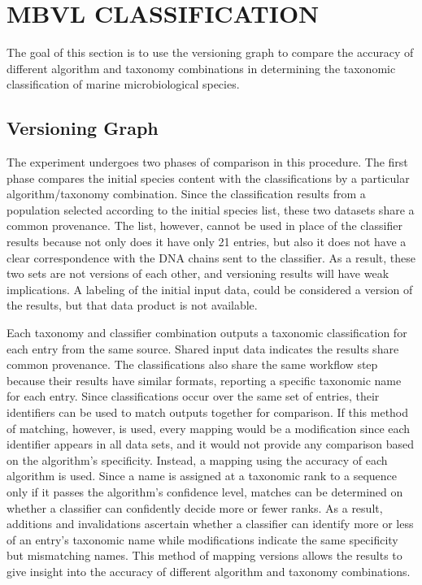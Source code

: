 
\chapter{MBVL CLASSIFICATION}\label{ch:mbvl`}

The goal of this section is to use the versioning graph to compare the accuracy of different algorithm and taxonomy combinations in determining the taxonomic classification of marine microbiological species.

\section{Versioning Graph}

The experiment undergoes two phases of comparison in this procedure.
The first phase compares the initial species content with the classifications by a particular algorithm/taxonomy combination.
Since the classification results from a population selected according to the initial species list, these two datasets share a common provenance.
The list, however, cannot be used in place of the classifier results because not only does it have only 21 entries, but also it does not have a clear correspondence with the DNA chains sent to the classifier.
As a result, these two sets are not versions of each other, and versioning results will have weak implications.
A labeling of the initial input data, could be considered a version of the results, but that data product is not available.

Each taxonomy and classifier combination outputs a taxonomic classification for each entry from the same source.
Shared input data indicates the results share common provenance.
The classifications also share the same workflow step because their results have similar formats, reporting a specific taxonomic name for each entry.
Since classifications occur over the same set of entries, their identifiers can be used to match outputs together for comparison.
If this method of matching, however, is used, every mapping would be a modification since each identifier appears in all data sets, and it would not provide any comparison based on the algorithm's specificity.
Instead, a mapping using the accuracy of each algorithm is used.
Since a name is assigned at a taxonomic rank to a sequence only if it passes the algorithm's confidence level, matches can be determined on whether a classifier can confidently decide more or fewer ranks.
As a result, additions and invalidations ascertain whether a classifier can identify more or less of an entry's taxonomic name while modifications indicate the same specificity but mismatching names.
This method of mapping versions allows the results to give insight into the accuracy of different algorithm and taxonomy combinations.


